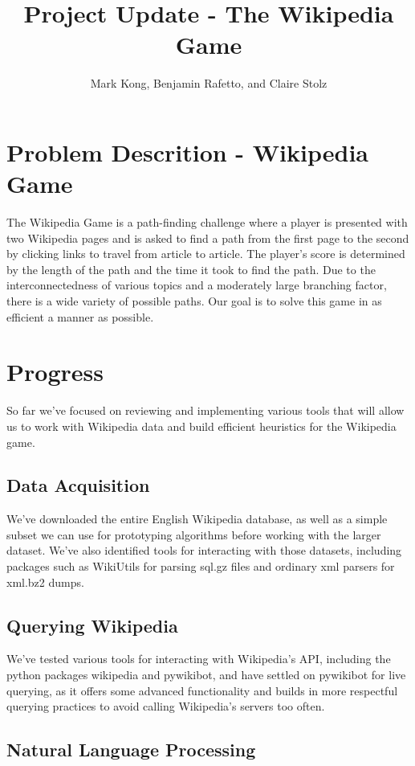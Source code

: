 \documentclass[11pt]{article}
\title{Project Update - The Wikipedia Game}
\author{Mark Kong, Benjamin Rafetto, and Claire Stolz}
\begin{document}
\maketitle{}


\section{Problem Descrition - Wikipedia Game}
The Wikipedia Game is a path-finding challenge where a player is presented with two Wikipedia pages and is asked to find a path from the first page to the second by clicking links to travel from article to article. The player's score is determined by the length of the path and the time it took to find the path. Due to the interconnectedness of various topics and a moderately large branching factor, there is a wide variety of possible paths. Our goal is to solve this game in as efficient a manner as possible.

\section{Progress}

So far we've focused on reviewing and implementing various tools that will allow us to work with Wikipedia data and build efficient heuristics for the Wikipedia game.

\subsection{Data Acquisition}

We've downloaded the entire English Wikipedia database, as well as a simple subset we can use for prototyping algorithms before working with the larger dataset. We've also identified tools for interacting with those datasets, including packages such as WikiUtils for parsing sql.gz files and ordinary xml parsers for xml.bz2 dumps.

\subsection{Querying Wikipedia}

We've tested various tools for interacting with Wikipedia's API, including the python packages wikipedia and pywikibot, and have settled on pywikibot for live querying, as it offers some advanced functionality and builds in more respectful querying practices to avoid calling Wikipedia's servers too often.

\subsection{Natural Language Processing}
\end{document}
